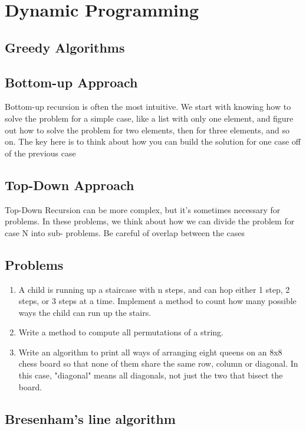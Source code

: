 \documentclass{article}
\begin{document}
\clearpage
\section{Dynamic Programming}
	\subsection{Greedy Algorithms}
	\subsection{Bottom-up Approach}
	Bottom-up recursion is often the most intuitive. We start with knowing how to solve the
	problem for a simple case, like a list with only one element, and figure out how to solve
	the problem for two elements, then for three elements, and so on. The key here is to
	think about how you can build the solution for one case off of the previous case
	\subsection{Top-Down Approach}
	Top-Down Recursion can be more complex, but it's sometimes necessary for problems.
	In these problems, we think about how we can divide the problem for case N into sub-
	problems. Be careful of overlap between the cases


\subsection{Problems}
	\begin{enumerate}
		\item A child is running up a staircase with n steps, and can hop either 1 step, 2 steps, or 3 steps at a time. Implement a method to count how many possible ways the child can run up the stairs.
		\item Write a method to compute all permutations of a string.
		\item Write an algorithm to print all ways of arranging eight queens on an 8x8 chess board so that none of them share the same row, column or diagonal. In this case, "diagonal" means all diagonals, not just the two that bisect the board.
	\end{enumerate}

	\subsection{Bresenham's line algorithm}
\end{document}
